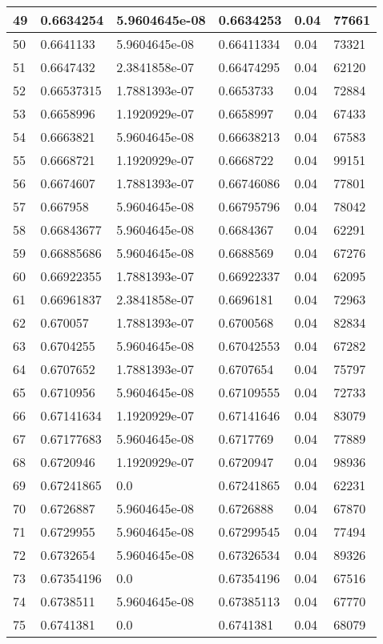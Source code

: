\begin{longtable}{|l|l|l|l|l|l|}
49 & 0.6634254 & 5.9604645e-08 & 0.6634253 & 0.04 & 77661 \\ \hline 
50 & 0.6641133 & 5.9604645e-08 & 0.66411334 & 0.04 & 73321 \\ \hline 
51 & 0.6647432 & 2.3841858e-07 & 0.66474295 & 0.04 & 62120 \\ \hline 
52 & 0.66537315 & 1.7881393e-07 & 0.6653733 & 0.04 & 72884 \\ \hline 
53 & 0.6658996 & 1.1920929e-07 & 0.6658997 & 0.04 & 67433 \\ \hline 
54 & 0.6663821 & 5.9604645e-08 & 0.66638213 & 0.04 & 67583 \\ \hline 
55 & 0.6668721 & 1.1920929e-07 & 0.6668722 & 0.04 & 99151 \\ \hline 
56 & 0.6674607 & 1.7881393e-07 & 0.66746086 & 0.04 & 77801 \\ \hline 
57 & 0.667958 & 5.9604645e-08 & 0.66795796 & 0.04 & 78042 \\ \hline 
58 & 0.66843677 & 5.9604645e-08 & 0.6684367 & 0.04 & 62291 \\ \hline 
59 & 0.66885686 & 5.9604645e-08 & 0.6688569 & 0.04 & 67276 \\ \hline 
60 & 0.66922355 & 1.7881393e-07 & 0.66922337 & 0.04 & 62095 \\ \hline 
61 & 0.66961837 & 2.3841858e-07 & 0.6696181 & 0.04 & 72963 \\ \hline 
62 & 0.670057 & 1.7881393e-07 & 0.6700568 & 0.04 & 82834 \\ \hline 
63 & 0.6704255 & 5.9604645e-08 & 0.67042553 & 0.04 & 67282 \\ \hline 
64 & 0.6707652 & 1.7881393e-07 & 0.6707654 & 0.04 & 75797 \\ \hline 
65 & 0.6710956 & 5.9604645e-08 & 0.67109555 & 0.04 & 72733 \\ \hline 
66 & 0.67141634 & 1.1920929e-07 & 0.67141646 & 0.04 & 83079 \\ \hline 
67 & 0.67177683 & 5.9604645e-08 & 0.6717769 & 0.04 & 77889 \\ \hline 
68 & 0.6720946 & 1.1920929e-07 & 0.6720947 & 0.04 & 98936 \\ \hline 
69 & 0.67241865 & 0.0 & 0.67241865 & 0.04 & 62231 \\ \hline 
70 & 0.6726887 & 5.9604645e-08 & 0.6726888 & 0.04 & 67870 \\ \hline 
71 & 0.6729955 & 5.9604645e-08 & 0.67299545 & 0.04 & 77494 \\ \hline 
72 & 0.6732654 & 5.9604645e-08 & 0.67326534 & 0.04 & 89326 \\ \hline 
73 & 0.67354196 & 0.0 & 0.67354196 & 0.04 & 67516 \\ \hline 
74 & 0.6738511 & 5.9604645e-08 & 0.67385113 & 0.04 & 67770 \\ \hline 
75 & 0.6741381 & 0.0 & 0.6741381 & 0.04 & 68079 \\ \hline 
\end{longtable}